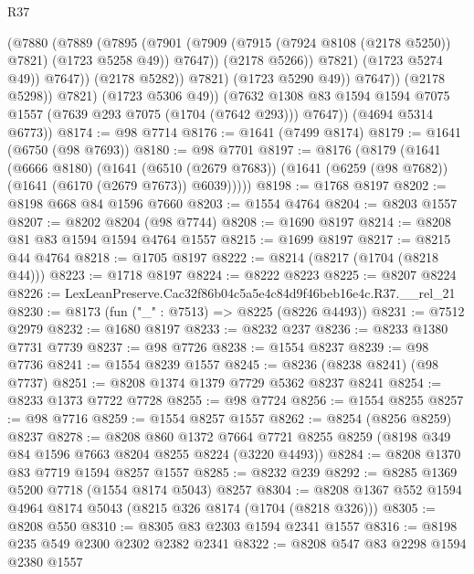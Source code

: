 \begin{lexlean}{R37}
\begin{coremodule}
                              (@7880
                                (@7889
                                  (@7895
                                    (@7901
                                      (@7909
                                        (@7915 (@7924 @8108 (@2178 @5250)) @7821)
                                        (@1723 @5258 @49))
                                      @7647))
                                  (@2178 @5266))
                                @7821)
                              (@1723 @5274 @49))
                            @7647))
                        (@2178 @5282))
                      @7821)
                    (@1723 @5290 @49))
                  @7647))
              (@2178 @5298))
            @7821)
          (@1723 @5306 @49))
        (@7632 @1308 @83 @1594 @1594 @7075 @1557 (@7639 @293 @7075 (@1704 (@7642 @293))) @7647))
      (@4694 @5314 @6773))
@8174 := @98 @7714
@8176 := @1641 (@7499 @8174)
@8179 := @1641 (@6750 (@98 @7693))
@8180 := @98 @7701
@8197 := @8176
    (@8179
      (@1641
        (@6666 @8180)
        (@1641
          (@6510 (@2679 @7683))
          (@1641 (@6259 (@98 @7682)) (@1641 (@6170 (@2679 @7673)) @6039)))))
@8198 := @1768 @8197
@8202 := @8198 @668 @84 @1596 @7660
@8203 := @1554 @4764
@8204 := @8203 @1557
@8207 := @8202 @8204 (@98 @7744)
@8208 := @1690 @8197
@8214 := @8208 @81 @83 @1594 @1594 @4764 @1557
@8215 := @1699 @8197
@8217 := @8215 @44 @4764
@8218 := @1705 @8197
@8222 := @8214 (@8217 (@1704 (@8218 @44)))
@8223 := @1718 @8197
@8224 := @8222 @8223
@8225 := @8207 @8224
@8226 := LexLeanPreserve.Cac32f86b04c5a5e4c84d9f46beb16e4c.R37.__rel_21
@8230 := @8173 (fun ("_" : @7513) => @8225 (@8226 @4493))
@8231 := @7512 @2979
@8232 := @1680 @8197
@8233 := @8232 @237
@8236 := @8233 @1380 @7731 @7739
@8237 := @98 @7726
@8238 := @1554 @8237
@8239 := @98 @7736
@8241 := @1554 @8239 @1557
@8245 := @8236 (@8238 @8241) (@98 @7737)
@8251 := @8208 @1374 @1379 @7729 @5362 @8237 @8241
@8254 := @8233 @1373 @7722 @7728
@8255 := @98 @7724
@8256 := @1554 @8255
@8257 := @98 @7716
@8259 := @1554 @8257 @1557
@8262 := @8254 (@8256 @8259) @8237
@8278 := @8208
    @860
    @1372
    @7664
    @7721
    @8255
    @8259
    (@8198 @349 @84 @1596 @7663 @8204 @8255 @8224 (@3220 @4493))
@8284 := @8208 @1370 @83 @7719 @1594 @8257 @1557
@8285 := @8232 @239
@8292 := @8285 @1369 @5200 @7718 (@1554 @8174 @5043) @8257
@8304 := @8208 @1367 @552 @1594 @4964 @8174 @5043 (@8215 @326 @8174 (@1704 (@8218 @326)))
@8305 := @8208 @550
@8310 := @8305 @83 @2303 @1594 @2341 @1557
@8316 := @8198 @235 @549 @2300 @2302 @2382 @2341
@8322 := @8208 @547 @83 @2298 @1594 @2380 @1557

\end{coremodule}
\end{lexlean}
